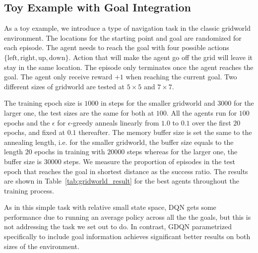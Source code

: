 \documentclass{article} %
\begin{document}
\subsection{Toy Example with Goal  Integration}
As a toy example, we introduce a type of navigation task in the classic gridworld environment. The locations for the starting point and goal are randomized for each episode. The agent needs to reach the goal with four possible actions $\{\text{left},\text{right},\text{up},\text{down}\}$. Action that will make the agent go off the grid will leave it stay in the same location. The episode only terminates once the agent reaches the goal. The agent only receive reward $+1$ when reaching the current goal. Two different sizes of gridworld are tested at $5\times5$ and $7\times7$. 

The training epoch size is $1000$ in steps for the smaller gridworld and $3000$ for the larger one, the test sizes are the same for both at $100$. All the agents run for $100$ epochs and the $\epsilon$ for $\epsilon$-greedy anneals linearly from $1.0$ to $0.1$ over the first $20$ epochs, and fixed at $0.1$ thereafter. The memory buffer size is set the same to the annealing length, i.e. for the smaller gridworld, the buffer size equals to the length $20$ epochs in training with $20000$ steps whereas for the larger one, the buffer size is $30000$ steps.
We measure the proportion of episodes in the test epoch that reaches the goal in shortest distance as the success ratio. The results are shown in Table~\ref{tab:gridworld_result} for the best agents throughout the training process.

As in this simple task with relative small state space, DQN gets some performance due to running an average policy across all the the goals, but this is not addressing the task we set out to do. In contrast, GDQN parametrized specifically to include goal information achieves significant better results on both sizes of the environment.
\end{document}
